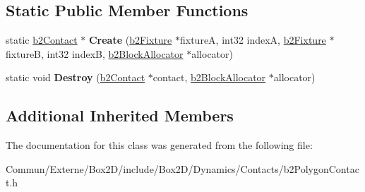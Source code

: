 \subsection*{Static Public Member Functions}
\begin{DoxyCompactItemize}
\item 
static \hyperlink{classb2_contact}{b2\+Contact} $\ast$ {\bfseries Create} (\hyperlink{classb2_fixture}{b2\+Fixture} $\ast$fixtureA, int32 indexA, \hyperlink{classb2_fixture}{b2\+Fixture} $\ast$fixtureB, int32 indexB, \hyperlink{classb2_block_allocator}{b2\+Block\+Allocator} $\ast$allocator)\hypertarget{classb2_polygon_contact_a6f72e00b9f4870b214477073be35f592}{}\label{classb2_polygon_contact_a6f72e00b9f4870b214477073be35f592}

\item 
static void {\bfseries Destroy} (\hyperlink{classb2_contact}{b2\+Contact} $\ast$contact, \hyperlink{classb2_block_allocator}{b2\+Block\+Allocator} $\ast$allocator)\hypertarget{classb2_polygon_contact_a8f9687ed70a02550095cf80d3bbefc92}{}\label{classb2_polygon_contact_a8f9687ed70a02550095cf80d3bbefc92}

\end{DoxyCompactItemize}
\subsection*{Additional Inherited Members}


The documentation for this class was generated from the following file\+:\begin{DoxyCompactItemize}
\item 
Commun/\+Externe/\+Box2\+D/include/\+Box2\+D/\+Dynamics/\+Contacts/b2\+Polygon\+Contact.\+h\end{DoxyCompactItemize}
